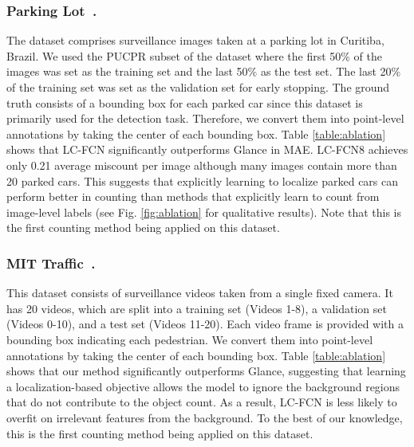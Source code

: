 \documentclass[runningheads]{llncs}
\begin{document}
\subsubsection{Parking Lot~\cite{de2015pklot}.}
The dataset comprises surveillance images taken at a parking lot in Curitiba, Brazil. We used the PUCPR subset of the dataset where the first 50\% of the images was set as the training set and the last 50\% as the test set. The last 20\% of the training set was set as the validation set for early stopping. The ground truth consists of a bounding box for each parked car since this dataset is primarily used for the detection task. Therefore, we convert them into point-level annotations by taking the center of each bounding box. Table \ref{table:ablation} shows that LC-FCN significantly outperforms Glance in MAE. LC-FCN8 achieves only 0.21 average miscount per image although many images contain more than 20 parked cars. This suggests that explicitly learning to localize parked cars can perform better in counting than methods that explicitly learn to count from image-level labels (see Fig. \ref{fig:ablation} for qualitative results). Note that this is the first counting method being applied on this dataset.

\vspace{-.5cm}
\subsubsection{MIT Traffic~\cite{wang2011automatic}.} This dataset consists of surveillance videos taken from a single fixed camera. It has 20 videos, which are split into a training set (Videos 1-8), a validation set (Videos 0-10), and a test set (Videos 11-20). Each video frame is provided with a bounding box indicating each pedestrian. We convert them into point-level annotations by taking the center of each bounding box. Table \ref{table:ablation} shows that our method significantly outperforms Glance, suggesting that learning a localization-based objective allows the model to ignore the background regions that do not contribute to the object count. As a result, LC-FCN is less likely to overfit on irrelevant features from the background. To the best of our knowledge, this is the first counting method being applied on this dataset.
\end{document}
